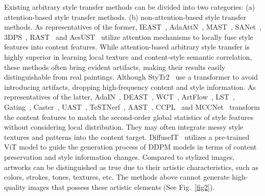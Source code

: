 \documentclass[times,twocolumn,final,authoryear]{elsarticle}
\begin{document}
Existing arbitrary style transfer methods can be divided into two categories: (a) attention-based style transfer methods. (b) non-attention-based style transfer methods. 
As representatives of the former, IEAST~\citep{chen2021artistic}, AdaAttN~\citep{liu2021adaattn}, MAST~\citep{deng2020arbitrary}, SANet~\citep{park2019arbitrary}, 3DPS~\citep{mu20223d}, RAST~\citep{ma2023rast} and AesUST~\citep{wang2022aesust} utilize attention mechanisms to locally fuse style features into
content features. While attention-based arbitrary style transfer is highly superior in learning local texture and content-style semantic correlation, these methods often bring evident artifacts, making their results easily
distinguishable from real paintings. Although StyTr2~\citep{deng2022stytr2} use a transformer to avoid introducing artifacts, dropping high-frequency content and style information. As representatives of the latter, AdaIN~\citep{huang2017arbitrary}, DEAST~\citep{zhang2022domain}, WCT~\citep{li2017universal}, ArtFlow~\citep{an2021artflow}, LST~\citep{li2019learning}, Gating~\citep{yang2022gating}, Caster~\citep{zhang2023caster}, UAST~\citep{cheng2023user}, TeSTNerf~\citep{chen2023TeSTNeRF}, AAST~\citep{hu2020aesthetic}, CCPL~\citep{wu2022ccpl} and MCCNet~\citep{deng2021arbitrary} transform the
content features to match the second-order global statistics of style
features without considering local distribution. They may often integrate messy style textures and patterns
into the content target. DiffuseIT~\citep{kwon2022diffusion} utilizes a pre-trained ViT model to guide
the generation process of DDPM models in terms of content preservation and style information changes. Compared to stylized images, artworks can be distinguished as true due to their artistic characteristics, such as colors, strokes, tones, textures, etc. 
The methods above cannot generate high-quality images that possess these artistic elements (See Fig.~\ref{fig2}).
\end{document}
